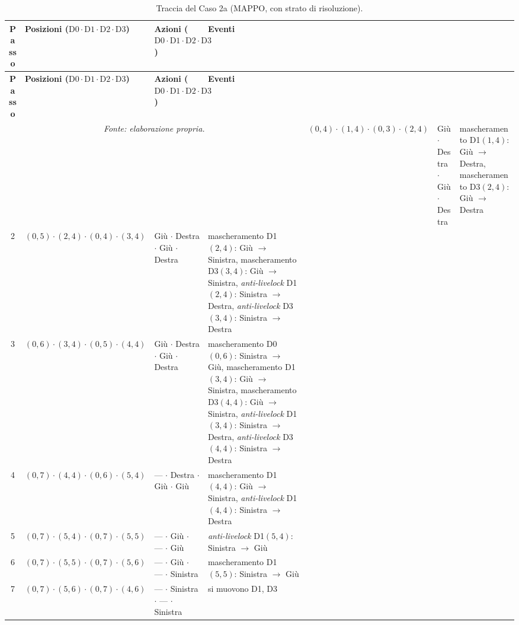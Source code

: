 \documentclass[12pt,a4paper,twoside]{report}
\begin{document}
{\footnotesize
\setlength{\tabcolsep}{3.5pt}
\begin{longtable}{c l l >{\raggedright\arraybackslash}p{3.8cm}}
\caption{Traccia del Caso 2a (MAPPO, con strato di risoluzione).}\\
\toprule
\textbf{Passo} & \textbf{Posizioni ($\text{D0} \cdot \text{D1} \cdot \text{D2} \cdot \text{D3}$)} & \textbf{Azioni ($\text{D0} \cdot \text{D1} \cdot \text{D2} \cdot \text{D3}$)} & \textbf{Eventi} \\
\midrule
\endfirsthead
\toprule
\textbf{Passo} & \textbf{Posizioni ($\text{D0} \cdot \text{D1} \cdot \text{D2} \cdot \text{D3}$)} & \textbf{Azioni ($\text{D0} \cdot \text{D1} \cdot \text{D2} \cdot \text{D3}$)} & \textbf{Eventi} \\
\midrule
\endhead
\bottomrule
\multicolumn{4}{c}{\footnotesize\emph{Fonte: elaborazione propria.}}
\endlastfoot
1  & $(0, 4) \cdot (1, 4) \cdot (0, 3) \cdot (2, 4)$ & Giù $\cdot$ Destra $\cdot$ Giù $\cdot$ Destra   & mascheramento D1$(1, 4)$: Giù $\to$ Destra, mascheramento D3$(2, 4)$: Giù $\to$ Destra \\
2  & $(0, 5) \cdot (2, 4) \cdot (0, 4) \cdot (3, 4)$ & Giù $\cdot$ Destra $\cdot$ Giù $\cdot$ Destra   & mascheramento D1$(2, 4)$: Giù $\to$ Sinistra, mascheramento D3$(3, 4)$: Giù $\to$ Sinistra, \emph{anti-livelock} D1$(2, 4)$: Sinistra $\to$ Destra, \emph{anti-livelock} D3$(3, 4)$: Sinistra $\to$ Destra \\
3  & $(0, 6) \cdot (3, 4) \cdot (0, 5) \cdot (4, 4)$ & Giù $\cdot$ Destra $\cdot$ Giù $\cdot$ Destra   & mascheramento D0$(0, 6)$: Sinistra $\to$ Giù, mascheramento D1$(3, 4)$: Giù $\to$ Sinistra, mascheramento D3$(4, 4)$: Giù $\to$ Sinistra, \emph{anti-livelock} D1$(3, 4)$: Sinistra $\to$ Destra, \emph{anti-livelock} D3$(4, 4)$: Sinistra $\to$ Destra \\
4  & $(0, 7) \cdot (4, 4) \cdot (0, 6) \cdot (5, 4)$ & --- $\cdot$ Destra $\cdot$ Giù $\cdot$ Giù      & mascheramento D1$(4, 4)$: Giù $\to$ Sinistra, \emph{anti-livelock} D1$(4, 4)$: Sinistra $\to$ Destra \\
5  & $(0, 7) \cdot (5, 4) \cdot (0, 7) \cdot (5, 5)$ & --- $\cdot$ Giù $\cdot$ --- $\cdot$ Giù         & \emph{anti-livelock} D1$(5, 4)$: Sinistra $\to$ Giù \\
6  & $(0, 7) \cdot (5, 5) \cdot (0, 7) \cdot (5, 6)$ & --- $\cdot$ Giù $\cdot$ --- $\cdot$ Sinistra    & mascheramento D1$(5, 5)$: Sinistra $\to$ Giù \\
7  & $(0, 7) \cdot (5, 6) \cdot (0, 7) \cdot (4, 6)$ & --- $\cdot$ Sinistra $\cdot$ --- $\cdot$ Sinistra & si muovono D1, D3 \\

\end{longtable}}
\end{document}
